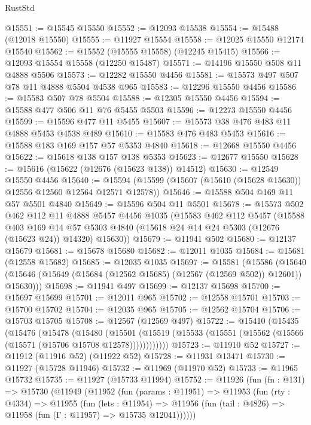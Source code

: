 \begin{lexlean}{RustStd}
\begin{coremodule}
@15551 := @15545 @15550
@15552 := @12093 @15538
@15554 := @15488 (@12018 @15550)
@15555 := @11927 @15554
@15558 := @12025 @15550 @12174 @15540
@15562 := @15552 (@15555 @15558) (@12245 @15415)
@15566 := @12093 @15554 @15558 (@12250 @15487)
@15571 := @14196 @15550 @508 @11 @4888 @5506
@15573 := @12282 @15550 @4456
@15581 := @15573 @497 @507 @78 @11 @4888 @5504 @4538 @965
@15583 := @12296 @15550 @4456
@15586 := @15583 @507 @78 @5504
@15588 := @12305 @15550 @4456
@15594 := @15588 @477 @506 @11 @76 @5455 @5503
@15596 := @12273 @15550 @4456
@15599 := @15596 @477 @11 @5455
@15607 := @15573 @38 @476 @483 @11 @4888 @5453 @4538 @489
@15610 := @15583 @476 @483 @5453
@15616 := @15588 @183 @169 @157 @57 @5353 @4840
@15618 := @12668 @15550 @4456
@15622 := @15618 @138 @157 @138 @5353
@15623 := @12677 @15550
@15628 := @15616 (@15622 (@12676 (@15623 @138)) @14512)
@15630 := @12549 @15550 @4456
@15640 := @15594 (@15599 (@15607 (@15610 (@15628 @15630)) @12556 @12560 @12564 @12571 @12578))
@15646 := @15588 @504 @169 @11 @57 @5501 @4840
@15649 := @15596 @504 @11 @5501
@15678 := @15573
    @502
    @462
    @112
    @11
    @4888
    @5457
    @4456
    @1035
    (@15583
      @462
      @112
      @5457
      (@15588
        @403
        @169
        @14
        @57
        @5303
        @4840
        (@15618 @24 @14 @24 @5303 (@12676 (@15623 @24)) @14320)
        @15630))
@15679 := @11941 @502
@15680 := @12137 @15679
@15681 := @15678 @15680
@15682 := @12011 @1035
@15684 := @15681 (@12558 @15682)
@15685 := @12035 @1035
@15697 := @15581
    (@15586
      (@15640 (@15646 (@15649 (@15684 (@12562 @15685) (@12567 (@12569 @502)) @12601)) @15630)))
@15698 := @11941 @497
@15699 := @12137 @15698
@15700 := @15697 @15699
@15701 := @12011 @965
@15702 := @12558 @15701
@15703 := @15700 @15702
@15704 := @12035 @965
@15705 := @12562 @15704
@15706 := @15703 @15705
@15708 := @12567 (@12569 @497)
@15722 := @15410
    (@15435
      (@15476
        (@15478
          (@15480
            (@15501
              (@15519 (@15533 (@15551 (@15562 (@15566 (@15571 (@15706 @15708 @12578))))))))))))
@15723 := @11910 @52
@15727 := @11912 (@11916 @52) (@11922 @52)
@15728 := @11931 @13471
@15730 := @11927 (@15728 @11946)
@15732 := @11969 (@11970 @52)
@15733 := @11965 @15732
@15735 := @11927 (@15733 @11994)
@15752 := @11926
    (fun (fn : @131) =>
    @15730
      (@11949
        (@11952
          (fun (params : @11951) =>
          @11953
            (fun (rty : @4334) =>
            @11955
              (fun (lets : @11954) =>
              @11956 (fun (tail : @4826) => @11958 (fun (Γ : @11957) => @15735 @12041))))))

\end{coremodule}
\end{lexlean}
